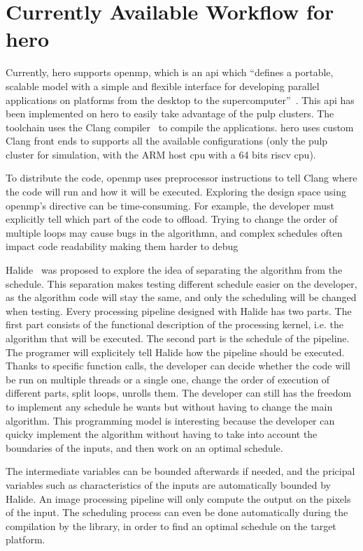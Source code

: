 \section {Currently Available Workflow for \gls{hero}}
    Currently, \gls{hero} supports \gls{openmp}, which is an \gls{api} which ``defines a portable, scalable model with a simple and flexible interface for developing parallel applications on platforms from the desktop to the supercomputer''~\cite{Web:OpenMp}. This \gls{api} has been implemented on \gls{hero} to easily take advantage of the \gls{pulp} clusters. The toolchain uses the Clang compiler~\cite{Web:Wikipedia_OpenMP} to compile the applications. \gls{hero} uses custom Clang front ends to supports all the available configurations (only the \gls{pulp} cluster for simulation, with the ARM host \gls{cpu}  with a 64 bits \gls{riscv} \gls{cpu}).

    To distribute the code, \gls{openmp} uses preprocessor instructions to tell Clang where the code will run and how it will be executed. Exploring the design space using \gls{openmp}'s directive can be time-consuming. For example, the developer must explicitly tell which part of the code to offload. Trying to change the order of multiple loops may cause bugs in the algorithmn, and complex schedules often impact code readability making them harder to debug

    Halide~\cite{Art:Halide} was proposed to explore the idea of separating the algorithm from the schedule.
    This separation makes testing different schedule easier on the developer, as the algorithm code will stay the same, and only the scheduling will be changed when testing.
    Every processing pipeline designed with Halide has two parts. The first part consists of the functional description of the processing kernel, i.e. the algorithm that will be executed. 
	The second part is the schedule of the pipeline. The programer will explicitely tell Halide how the pipeline should be executed. Thanks to specific function calls, the developer can decide whether the code will be run on multiple threads or a single one, change the order of execution of different parts, split loops, unrolls them. The developer can still has the freedom to implement any schedule he wants but without having to change the main algorithm.
    This programming model is interesting because the developer can quicky implement the algorithm without having to take into account the boundaries of the inputs, and then work on an optimal schedule.

    The intermediate variables can be bounded afterwards if needed, and the pricipal variables such as characteristics of the inputs are automatically bounded by Halide. An image processing pipeline will only compute the output on the pixels of the input.
    The scheduling process can even be done automatically during the compilation by the library, in order to find an optimal schedule on the target platform.

